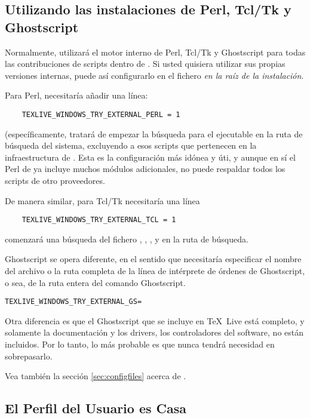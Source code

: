 \documentclass{article}
\begin{document}
\subsection{Utilizando las instalaciones de Perl, Tcl/Tk y Ghostscript}
\label{sec:externalwndws}

Normalmente, \TL{} utilizará el motor interno de Perl, Tcl/Tk y Ghostscript
para todas las contribuciones de scripts dentro de \TL. Si usted
quisiera utilizar sus propias versiones internas, puede así configurarlo
en el fichero  \emph{en la raíz de la instalación}.

Para Perl,  necesitaría añadir una línea:
\begin{verbatim}
    TEXLIVE_WINDOWS_TRY_EXTERNAL_PERL = 1
\end{verbatim}

\TL{} (específicamente,  tratará de
empezar la búsqueda para el ejecutable  en la ruta de
búsqueda del sistema, excluyendo a esos scripts que pertenecen en la
infraestructura de \TL{}. Esta es la configuración más idónea y úti,
y aunque en sí el Perl de \TL{} ya incluye muchos módulos adicionales,
no puede respaldar todos los scripts de otro proveedores.

De manera similar, para Tcl/Tk necesitaría una línea
\begin{verbatim}
    TEXLIVE_WINDOWS_TRY_EXTERNAL_TCL = 1
\end{verbatim}
\TL{} comenzará una búsqueda del fichero ,
, ,  y
 en la ruta de búsqueda.

Ghostscript se opera diferente, en el sentido que necesitaría
especificar el nombre del archivo o la ruta completa de la línea de
intérprete de órdenes de Ghostscript, o sea, de la ruta entera del
comando Ghostscript.
\begin{alltt}
    TEXLIVE_WINDOWS_TRY_EXTERNAL_GS = 
\end{alltt}

Otra diferencia es que el Ghostscript que se incluye en \TeX\ Live está
completo, y solamente la documentación y los drivers, los controladores
del software, no están incluidos. Por lo tanto, lo más probable es que
nunca tendrá necesidad en sobrepasarlo.

Vea también la sección \ref{sec:configfiles} acerca de .


\subsection{El Perfil del Usuario es Casa}
\label{sec:winhome}
\end{document}
